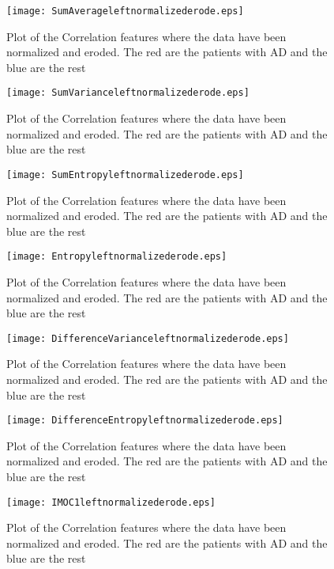 \begin{figure}[H]
  \centering
  \texttt{[image: SumAverageleftnormalizederode.eps]}
  \caption{Plot of the Correlation features where the data have been normalized and eroded. The red are the patients with AD and the blue are the rest}\label{fig:ContrastLeftNormalizedEroded}
\end{figure}

\begin{figure}[H]
  \centering
  \texttt{[image: SumVarianceleftnormalizederode.eps]}
  \caption{Plot of the Correlation features where the data have been normalized and eroded. The red are the patients with AD and the blue are the rest}\label{fig:ContrastLeftNormalizedEroded}
\end{figure}

\begin{figure}[H]
  \centering
  \texttt{[image: SumEntropyleftnormalizederode.eps]}
  \caption{Plot of the Correlation features where the data have been normalized and eroded. The red are the patients with AD and the blue are the rest}\label{fig:ContrastLeftNormalizedEroded}
\end{figure}

\begin{figure}[H]
  \centering
  \texttt{[image: Entropyleftnormalizederode.eps]}
  \caption{Plot of the Correlation features where the data have been normalized and eroded. The red are the patients with AD and the blue are the rest}\label{fig:ContrastLeftNormalizedEroded}
\end{figure}

\begin{figure}[H]
  \centering
  \texttt{[image: DifferenceVarianceleftnormalizederode.eps]}
  \caption{Plot of the Correlation features where the data have been normalized and eroded. The red are the patients with AD and the blue are the rest}\label{fig:ContrastLeftNormalizedEroded}
\end{figure}

\begin{figure}[H]
  \centering
  \texttt{[image: DifferenceEntropyleftnormalizederode.eps]}
  \caption{Plot of the Correlation features where the data have been normalized and eroded. The red are the patients with AD and the blue are the rest}\label{fig:ContrastLeftNormalizedEroded}
\end{figure}

\begin{figure}[H]
  \centering
  \texttt{[image: IMOC1leftnormalizederode.eps]}
  \caption{Plot of the Correlation features where the data have been normalized and eroded. The red are the patients with AD and the blue are the rest}\label{fig:ContrastLeftNormalizedEroded}
\end{figure}

